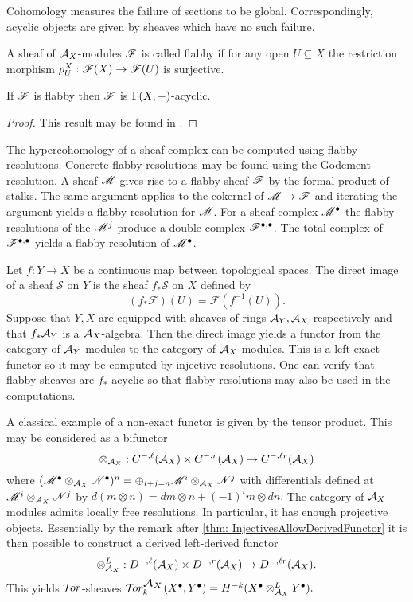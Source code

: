Cohomology measures the failure of sections to be global.
Correspondingly, acyclic objects are given by sheaves which have no such failure.
\begin{definition}
 A sheaf of $\AA_X$-modules $\F$ is called flabby if for any open $U\subseteq X$ the restriction morphism $\rho_U^X:\F(X)\to\F(U) $ is surjective.
\end{definition}
\begin{proposition}
 If $\F$ is flabby then $\F$ is $\Gamma(X,\blank)$-acyclic.
\end{proposition}
\begin{proof}
  This result may be found in \cite[Chapter 2]{dimca2004sheaves}.
\end{proof}
The hypercohomology of a sheaf complex can be computed using flabby resolutions.
Concrete flabby resolutions may be found using the Godement resolution.
A sheaf $\M$ gives rise to a flabby sheaf $\F$ by the formal product of stalks.
The same argument applies to the cokernel of $\M\to \F$ and iterating the argument yields a flabby resolution for $\M$.
For a sheaf complex $\M^\bullet$ the flabby resolutions of the $\M^{j}$ produce a double complex $\F^{\bullet,\bullet}$.
The total complex of $\F^{\bullet, \bullet}$ yields a flabby resolution of $\M^\bullet$.

Let $f:Y\to X$ be a continuous map between topological spaces.
The direct image of a sheaf $\mathcal{S}$ on $Y$ is the sheaf $f_*\mathcal{S}$ on $X$ defined by
$$(f_*\mathcal{F})(U) = \mathcal{F}(f^{-1}(U)). $$
Suppose that $Y,X$ are equipped with sheaves of rings $\AA_Y, \AA_X$ respectively and that $f_*\AA_Y$ is a $\AA_X$-algebra.
Then the direct image yields a functor from the category of $\AA_Y$-modules to the category of $\AA_X$-modules.
This is a left-exact functor so it may be computed by injective resolutions.
One can verify that flabby sheaves are $f_*$-acyclic so that flabby resolutions may also be used in the computations.

A classical example of a non-exact functor is given by the tensor product.
This may be considered as a bifunctor
$$ \otimes_{\AA_X} : C^{-,\ell}(\AA_X)\times C^{-,r}(\AA_X)\to C^{-,\ell r}(\AA_X)$$
where
$(\M^\bullet \otimes_{\AA_X} \N^\bullet)^n = \oplus_{i + j = n} \M^i \otimes_{\AA_X} \N^j $
with differentials defined at $\M^i \otimes_{\AA_X} \N^j$ by
$d(m\otimes n) = dm \otimes n + (-1)^i m \otimes dn.$
The category of $\AA_X$-modules admits locally free resolutions.
In particular, it has enough projective objects.
Essentially by the remark after \cref{thm: InjectivesAllowDerivedFunctor} it is then possible to construct a derived left-derived functor
$$ \otimes_{\AA_X}^L : D^{-,\ell}(\AA_X)\times D^{-,r}(\AA_X)\to D^{-,\ell r}(\AA_X).$$
This yields $\Tor$-sheaves
$\Tr{\AA_X}{k}(X^\bullet, Y^\bullet) = H^{-k}(X^\bullet\otimes_{\AA_X}^L Y^\bullet).$

